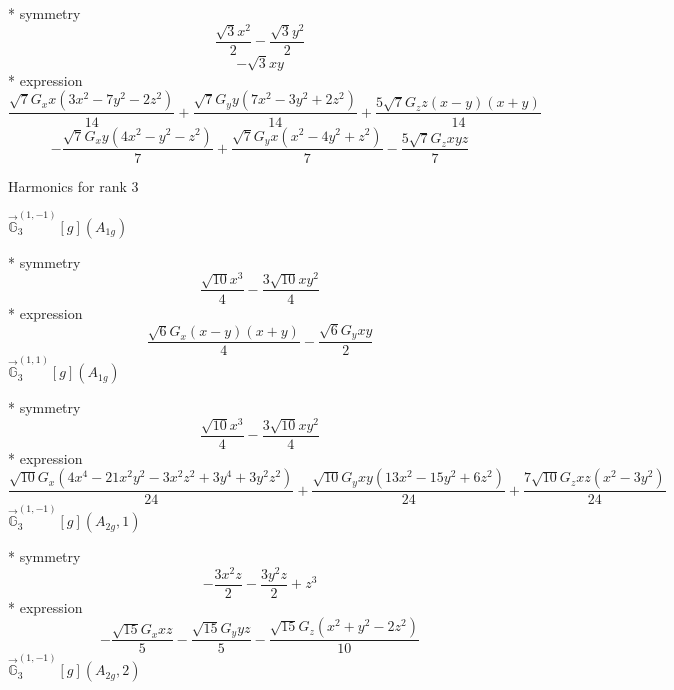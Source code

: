 \documentclass[fleqn,8pt]{jsarticle}
\begin{document}
\noindent\quad ** symmetry
\begin{dmath*}
\frac{\sqrt{3} x^{2}}{2} - \frac{\sqrt{3} y^{2}}{2}
\end{dmath*}
\begin{dmath*}
- \sqrt{3} x y
\end{dmath*}
\noindent\quad ** expression
\begin{dmath*}
\frac{\sqrt{7} G_{x} x \left(3 x^{2} - 7 y^{2} - 2 z^{2}\right)}{14} + \frac{\sqrt{7} G_{y} y \left(7 x^{2} - 3 y^{2} + 2 z^{2}\right)}{14} + \frac{5 \sqrt{7} G_{z} z \left(x - y\right) \left(x + y\right)}{14}
\end{dmath*}
\begin{dmath*}
- \frac{\sqrt{7} G_{x} y \left(4 x^{2} - y^{2} - z^{2}\right)}{7} + \frac{\sqrt{7} G_{y} x \left(x^{2} - 4 y^{2} + z^{2}\right)}{7} - \frac{5 \sqrt{7} G_{z} x y z}{7}
\end{dmath*}

\noindent * Harmonics for rank 3

\noindent\quad $\vec{\mathbb{G}}_{3}^{(1,-1)}[g](A_{1g})$

\noindent\quad ** symmetry
\begin{dmath*}
\frac{\sqrt{10} x^{3}}{4} - \frac{3 \sqrt{10} x y^{2}}{4}
\end{dmath*}
\noindent\quad ** expression
\begin{dmath*}
\frac{\sqrt{6} G_{x} \left(x - y\right) \left(x + y\right)}{4} - \frac{\sqrt{6} G_{y} x y}{2}
\end{dmath*}
\noindent\quad $\vec{\mathbb{G}}_{3}^{(1,1)}[g](A_{1g})$

\noindent\quad ** symmetry
\begin{dmath*}
\frac{\sqrt{10} x^{3}}{4} - \frac{3 \sqrt{10} x y^{2}}{4}
\end{dmath*}
\noindent\quad ** expression
\begin{dmath*}
\frac{\sqrt{10} G_{x} \left(4 x^{4} - 21 x^{2} y^{2} - 3 x^{2} z^{2} + 3 y^{4} + 3 y^{2} z^{2}\right)}{24} + \frac{\sqrt{10} G_{y} x y \left(13 x^{2} - 15 y^{2} + 6 z^{2}\right)}{24} + \frac{7 \sqrt{10} G_{z} x z \left(x^{2} - 3 y^{2}\right)}{24}
\end{dmath*}
\noindent\quad $\vec{\mathbb{G}}_{3}^{(1,-1)}[g](A_{2g},1)$

\noindent\quad ** symmetry
\begin{dmath*}
- \frac{3 x^{2} z}{2} - \frac{3 y^{2} z}{2} + z^{3}
\end{dmath*}
\noindent\quad ** expression
\begin{dmath*}
- \frac{\sqrt{15} G_{x} x z}{5} - \frac{\sqrt{15} G_{y} y z}{5} - \frac{\sqrt{15} G_{z} \left(x^{2} + y^{2} - 2 z^{2}\right)}{10}
\end{dmath*}
\noindent\quad $\vec{\mathbb{G}}_{3}^{(1,-1)}[g](A_{2g},2)$
\end{document}

